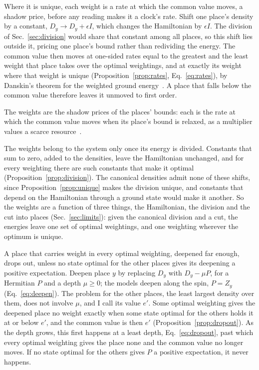 \documentclass[aps,prd,reprint,superscriptaddress]{revtex4-2}
\begin{document}
Where it is unique, each weight is a rate at which the common value moves, a shadow price, before any reading makes it a clock's rate. Shift one place's density by a constant, $D_y \to D_y + \epsilon I$, which changes the Hamiltonian by $\epsilon I$. The division of Sec.~\ref{sec:division} would share that constant among all places, so this shift lies outside it, pricing one place's bound rather than redividing the energy. The common value then moves at one-sided rates equal to the greatest and the least weight that place takes over the optimal weightings, and at exactly its weight where that weight is unique (Proposition~\ref{prop:rates}, Eq.~\eqref{eq:rates}), by Danskin's theorem for the weighted ground energy~\cite{Danskin1966}. A place that falls below the common value therefore leaves it unmoved to first order.

The weights are the shadow prices of the places' bounds: each is the rate at which the common value moves when its place's bound is relaxed, as a multiplier values a scarce resource~\cite{Kantorovich1960}.

The weights belong to the system only once its energy is divided. Constants that sum to zero, added to the densities, leave the Hamiltonian unchanged, and for every weighting there are such constants that make it optimal (Proposition~\ref{prop:division}). The canonical densities admit none of these shifts, since Proposition~\ref{prop:unique} makes the division unique, and constants that depend on the Hamiltonian through a ground state would make it another. So the weights are a function of three things, the Hamiltonian, the division and the cut into places (Sec.~\ref{sec:limits}): given the canonical division and a cut, the energies leave one set of optimal weightings, and one weighting wherever the optimum is unique.

A place that carries weight in every optimal weighting, deepened far enough, drops out, unless no state optimal for the other places gives its deepening a positive expectation. Deepen place $y$ by replacing $D_y$ with $D_y - \mu P$, for a Hermitian $P$ and a depth $\mu \ge 0$; the models deepen along the spin, $P = Z_y$ (Eq.~\eqref{eq:deepen}). The problem for the other places, the least largest density over them, does not involve $\mu$, and I call its value $e'$. Some optimal weighting gives the deepened place no weight exactly when some state optimal for the others holds it at or below $e'$, and the common value is then $e'$ (Proposition~\ref{prop:dropout}). As the depth grows, this first happens at a least depth, Eq.~\eqref{eq:dropout}, past which every optimal weighting gives the place none and the common value no longer moves. If no state optimal for the others gives $P$ a positive expectation, it never happens.
\end{document}
